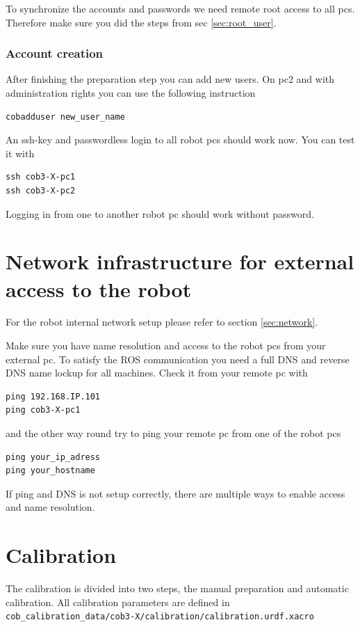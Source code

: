 To synchronize the accounts and passwords we need remote root access to all pcs. Therefore make sure you did the steps from sec \ref{sec:root_user}.

\subsubsection{Account creation}
After finishing the preparation step you can add new users. On pc2 and with administration rights you can use the following instruction
\begin{lstlisting}
cobadduser new_user_name
\end{lstlisting}

An ssh-key and passwordless login to all robot pcs should work now. You can test it with
\begin{lstlisting}
ssh cob3-X-pc1
ssh cob3-X-pc2
\end{lstlisting}
Logging in from one to another robot pc should work without password.

\section{Network infrastructure for external access to the robot}
For the robot internal network setup please refer to section \ref{sec:network}.

Make sure you have name resolution and access to the robot pcs from your external pc. To satisfy the ROS communication you need a full DNS and reverse DNS name lockup for all machines. Check it from your remote pc with
\begin{lstlisting}
ping 192.168.IP.101
ping cob3-X-pc1
\end{lstlisting}
and the other way round try to ping your remote pc from one of the robot pcs
\begin{lstlisting}
ping your_ip_adress
ping your_hostname
\end{lstlisting}

If ping and DNS is not setup correctly, there are multiple ways to enable access and name resolution.


\section{Calibration}
The calibration is divided into two steps, the manual preparation and automatic calibration. All calibration parameters are defined in \texttt{cob\_calibration\_data/cob3-X/calibration/calibration.urdf.xacro}

